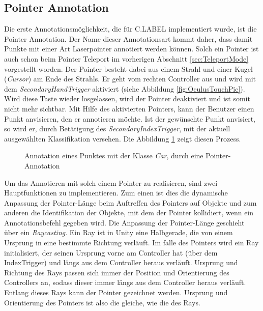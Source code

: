 \subsection{Pointer Annotation}
\label{sec:SimplePointerAnnotation}
Die erste Annotationsmöglichkeit, die für C.LABEL implementiert wurde, ist die Pointer Annotation. Der Name dieser Annotationsart kommt daher, dass damit Punkte mit einer Art Laserpointer annotiert werden können. Solch ein Pointer ist auch schon beim Pointer Teleport im vorherigen Abschnitt \ref{sec:TeleportMode} vorgestellt worden. Der Pointer besteht dabei aus einem Strahl und einer Kugel (\textit{Cursor}) am Ende des Strahls. Er geht vom rechten Controller aus und wird mit dem \textit{SecondaryHandTrigger} aktiviert (siehe Abbildung \ref{fig:OculusTouchPic}). Wird diese Taste wieder losgelassen, wird der Pointer deaktiviert und ist somit nicht mehr sichtbar. Mit Hilfe des aktivierten Pointers, kann der Benutzer einen Punkt anvisieren, den er annotieren möchte. Ist der gewünschte Punkt anvisiert, so wird er, durch Betätigung des \textit{SecondaryIndexTrigger}, mit der aktuell ausgewählten Klassifikation versehen. Die Abbildung \ref{fig:PointerAnnotation} zeigt diesen Prozess.\\ 

\begin{figure}%
	\centering
    \caption{Annotation eines Punktes mit der Klasse \textit{Car}, durch eine Pointer-Annotation}
    \label{fig:PointerAnnotation}
\end{figure}

Um das Annotieren mit solch einem Pointer zu realisieren, sind zwei Hauptfunktionen zu implementieren. Zum einen ist dies die dynamische Anpassung der Pointer-Länge beim Auftreffen des Pointers auf Objekte und zum anderen die Identifikation der Objekte, mit dem der Pointer kollidiert, wenn ein Annotationsbefehl gegeben wird. Die Anpassung der Pointer-Länge geschieht über ein \textit{Raycasting}. Ein Ray ist in Unity eine Halbgerade, die von einem Ursprung in eine bestimmte Richtung verläuft. Im falle des Pointers wird ein Ray initialisiert, der seinen Ursprung vorne am Controller hat (über dem IndexTrigger) und längs aus dem Controller heraus verläuft. Ursprung und Richtung des Rays passen sich immer der Position und Orientierung des Controllers an, sodass dieser immer längs aus dem Controller heraus verläuft. Entlang dieses Rays kann der Pointer gezeichnet werden. Ursprung und Orientierung des Pointers ist also die gleiche, wie die des Rays.\\ 

